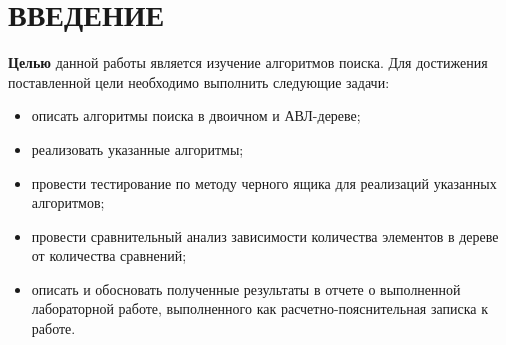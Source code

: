 \chapter*{ВВЕДЕНИЕ}

\textbf{Целью} данной работы является изучение алгоритмов поиска. Для достижения поставленной цели необходимо выполнить следующие задачи:
\begin{itemize}[label=---]
	\item описать алгоритмы поиска в двоичном и АВЛ-дереве;
	\item реализовать указанные алгоритмы;
	
	\item провести тестирование по методу черного ящика для реализаций указанных алгоритмов;
	
	\item провести сравнительный анализ зависимости количества элементов в дереве от количества сравнений;
	
	\item описать и обосновать полученные результаты в отчете о выполненной лабораторной работе, выполненного как расчетно-пояснительная записка к работе.
\end{itemize}